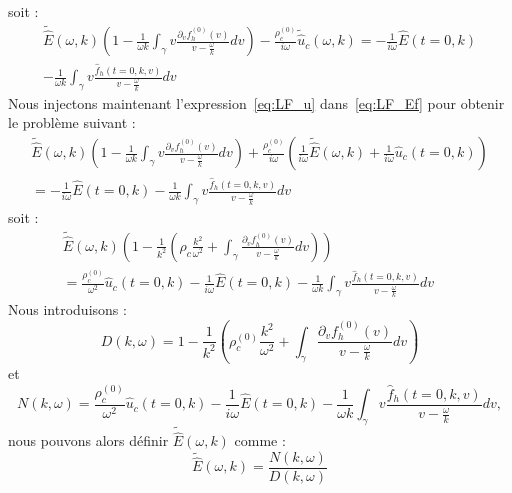 soit :
\begin{equation}
  \begin{aligned}
    \tilde{\hat{E}}(\omega,k)\left(1-\frac{1}{\omega k}\int_\gamma v\frac{\partial_vf_h^{(0)}(v)}{v-\frac{\omega}{k}}dv\right)-\frac{\rho_c^{(0)}}{i\omega}\tilde{\hat{u}}_c(\omega,k)=-\frac{1}{i\omega}\hat{E}(t=0,k)\nonumber\\
    -\frac{1}{\omega k}\int_\gamma v\frac{\hat{f}_h(t=0,k,v)}{v-\frac{\omega}{k}}dv
  \end{aligned}
  \label{eq:LF_Ef}
\end{equation}
Nous injectons maintenant l'expression~\eqref{eq:LF_u} dans~\eqref{eq:LF_Ef} pour obtenir le problème suivant :
$$
  \begin{aligned}
    \tilde{\hat{E}}(\omega,k)\left(1-\frac{1}{\omega k}\int_\gamma v\frac{\partial_vf_h^{(0)}(v)}{v-\frac{\omega}{k}}dv\right)+\frac{\rho_c^{(0)}}{i\omega}\left(\frac{1}{i\omega}\tilde{\hat{E}}(\omega,k)+\frac{1}{i\omega}\hat{u}_c(t=0,k)\right)\\
    =-\frac{1}{i\omega}\hat{E}(t=0,k)
    -\frac{1}{\omega k}\int_\gamma v\frac{\hat{f}_h(t=0,k,v)}{v-\frac{\omega}{k}}dv
  \end{aligned}
$$
soit :
$$
  \begin{aligned}
    \tilde{\hat{E}}(\omega,k)\left(1-\frac{1}{k^2}\left(\rho_c\frac{k^2}{\omega^2}+\int_\gamma \frac{\partial_vf_h^{(0)}(v)}{v-\frac{\omega}{k}}dv\right)\right)~~~~~~~~~~~~~~~~~~~~~~~~~~~~~~~~~~~~~~~~\\
    =\frac{\rho_c^{(0)}}{\omega^2}\hat{u}_c(t=0,k)-\frac{1}{i\omega}\hat{E}(t=0,k)
    -\frac{1}{\omega k}\int_\gamma v\frac{\hat{f}_h(t=0,k,v)}{v-\frac{\omega}{k}}dv
  \end{aligned}
$$
Nous introduisons :
\begin{equation}
  D(k,\omega) = 1-\frac{1}{k^2}\left( \rho_c^{(0)}\frac{k^2}{\omega^2}+\int_\gamma \frac{\partial_vf_h^{(0)}(v)}{v-\frac{\omega}{k}}dv\right )
  \label{eq:relD_H}
\end{equation}
et
\begin{equation}
  N(k,\omega) = \frac{\rho_c^{(0)}}{\omega^2}\hat{u}_c(t=0,k)-\frac{1}{i\omega}\hat{E}(t=0,k) 
    -\frac{1}{\omega k}\int_\gamma v\frac{\hat{f}_h(t=0,k,v)}{v-\frac{\omega}{k}}dv,
  \label{eq:relN_H}
\end{equation}
nous pouvons alors définir $\tilde{\hat{E}}(\omega,k)$ comme :
$$
  \tilde{\hat{E}}(\omega,k)=\frac{N(k,\omega)}{D(k,\omega)}
$$

